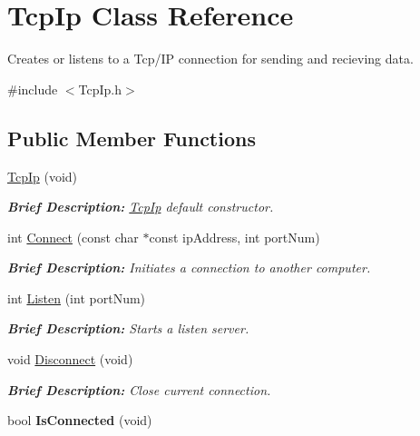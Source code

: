 \hypertarget{class_tcp_ip}{\section{Tcp\-Ip Class Reference}
\label{class_tcp_ip}
}


Creates or listens to a Tcp/\-I\-P connection for sending and recieving data.  




{\ttfamily \#include $<$Tcp\-Ip.\-h$>$}

\subsection*{Public Member Functions}
\begin{DoxyCompactItemize}
\item 
\hyperlink{class_tcp_ip_a02d777e201cc83b63b80d4b0f0da5867}{Tcp\-Ip} (void)
\begin{DoxyCompactList}\small\item\em {\bfseries Brief Description\-:} \hyperlink{class_tcp_ip}{Tcp\-Ip} default constructor. \end{DoxyCompactList}\item 
int \hyperlink{class_tcp_ip_a063576e534846f0e396aabadc1f40673}{Connect} (const char $\ast$const ip\-Address, int port\-Num)
\begin{DoxyCompactList}\small\item\em {\bfseries Brief Description\-:} Initiates a connection to another computer. \end{DoxyCompactList}\item 
int \hyperlink{class_tcp_ip_a9480c3b6ef549b3626b031c63e168038}{Listen} (int port\-Num)
\begin{DoxyCompactList}\small\item\em {\bfseries Brief Description\-:} Starts a listen server. \end{DoxyCompactList}\item 
void \hyperlink{class_tcp_ip_a7fea212b99a95097982d588e9b02a07c}{Disconnect} (void)
\begin{DoxyCompactList}\small\item\em {\bfseries Brief Description\-:} Close current connection. \end{DoxyCompactList}\item 
\hypertarget{class_tcp_ip_a1be8bd5ea7b0750e12af7e2f201778e5}{bool {\bfseries Is\-Connected} (void)}\label{class_tcp_ip_a1be8bd5ea7b0750e12af7e2f201778e5}


\end{DoxyCompactItemize}
